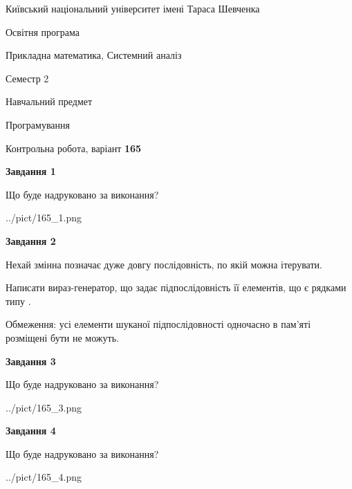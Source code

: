\documentclass[12pt, ukrainian]{article}
\begin{document}
{{\begin {small}\par
{ \center  Київський національний університет імені Тараса Шевченка \par}
{\parbox {5 cm}{Освітня програма \hfill}{\parbox {8 cm}{Прикладна математика, Системний аналіз \hfill}}\parbox {5 cm}{\hfill Семестр 2}}\par
{\parbox {5 cm} {Навчальний предмет \hfill}\parbox {7 cm}{Програмування \hfill}\parbox {6cm}{\hfill}\par}\vspace{-7pt} \end{small}}{\center Контрольна робота, варіант  \No \textbf
{ 165 }\par}}
{
\begin {large}
{\begin {center}\textbf{Завдання 1}\end {center}}\par
Що буде надруковано за виконання?\par\par
\begin{center}
	{../pict/165_1.png}
\end{center}
\newpage

{\begin {center}\textbf{Завдання 2}\end {center}}\par
Нехай змінна  позначає дуже довгу послідовність, по якій можна ітерувати.

Написати вираз-генератор, що задає підпослідовність її елементів, що є рядками типу .

Обмеження: усі елементи шуканої підпослідовності одночасно в пам'яті розміщені бути не можуть.\par
\newpage

{\begin {center}\textbf{Завдання 3}\end {center}}\par
Що буде надруковано за виконання?\par
\begin{center}
	{../pict/165_3.png}
\end{center}
\newpage

{\begin {center}\textbf{Завдання 4}\end {center}}\par
Що буде надруковано за виконання?\par
\begin{center}
	{../pict/165_4.png}
\end{center}
\newpage


\end{large}}
\end{document}
